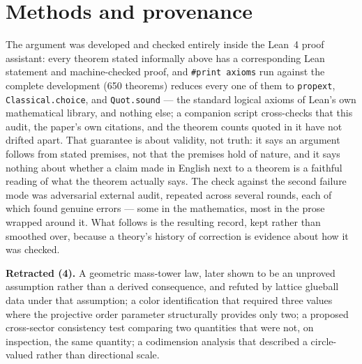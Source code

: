 \documentclass[pdflatex,sn-mathphys-num]{sn-jnl}
\theoremstyle{thmstyleone}
\theoremstyle{thmstylethree}
\theoremstyle{thmstyletwo}
\begin{document}
\section{Methods and provenance}\label{sec:register}

The argument was developed and checked entirely inside the Lean~4 proof
assistant: every theorem stated informally above has a corresponding
Lean statement and machine-checked proof, and \texttt{\#print axioms}
run against the complete development (650 theorems) reduces every one of
them to \texttt{propext}, \texttt{Classical.choice}, and
\texttt{Quot.sound} — the standard logical axioms of Lean's own
mathematical library, and nothing else; a companion script
cross-checks that this audit, the paper's own citations, and the
theorem counts quoted in it have not drifted apart. That guarantee is
about validity, not truth: it says an argument follows from stated
premises, not that the premises hold of nature, and it says nothing
about whether a claim made in English next to a theorem is a faithful
reading of what the theorem actually says. The check against the second
failure mode was adversarial external audit, repeated across several
rounds, each of which found genuine errors — some in the mathematics,
most in the prose wrapped around it. What follows is the resulting
record, kept rather than smoothed over, because a theory's history of
correction is evidence about how it was checked.

\textbf{Retracted (4).} A geometric mass-tower law, later shown to be an
unproved assumption rather than a derived consequence, and refuted by
lattice glueball data under that assumption; a color identification that
required three values where the projective order parameter structurally
provides only two; a proposed cross-sector consistency test comparing two
quantities that were not, on inspection, the same quantity; a
codimension analysis that described a circle-valued rather than
directional scale.
\end{document}
